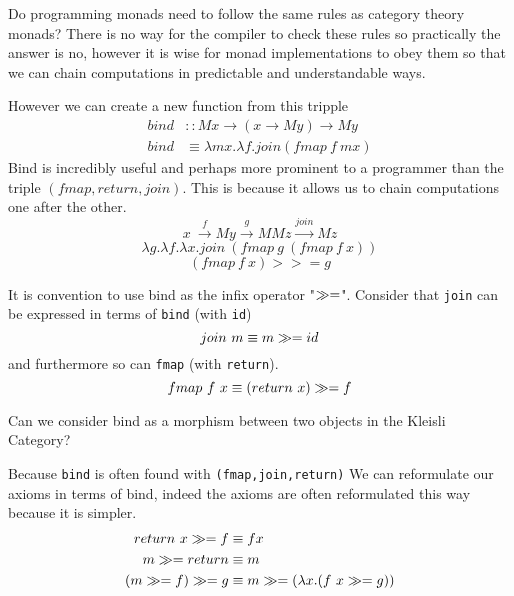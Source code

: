 Do programming monads need to follow the same rules as category theory monads?
There is no way for the compiler to check these rules so practically the answer is no,
however it is wise for monad implementations to obey them so that
we can chain computations in predictable and understandable ways.

However we can create a new function from this tripple
\begin{align}
    bind &:: M x \rightarrow (x \rightarrow M y) \rightarrow M y \\
    bind &\equiv \lambda mx. \lambda f. join(fmap\ f\ mx)
\end{align}
Bind is incredibly useful and perhaps more prominent
to a programmer than the triple $(fmap,return,join)$.
This is because it allows us to chain computations
one after the other.
\begin{equation}
    x\
    \stackrel{f}{\rightarrow} My
    \stackrel{g}{\rightarrow} MMz
    \stackrel{join}{\rightarrow} Mz
\end{equation}
\begin{equation}
    \lambda g.
    \lambda f.
    \lambda x.
    join\ (fmap\ g\ (fmap\ f\ x))
\end{equation}
\begin{equation}
    (fmap\ f\ x) >>= g
\end{equation}

It is convention to use bind as the infix operator "$\gg=$".
Consider that \texttt{join} can be expressed in terms of \texttt{bind} (with \texttt{id})
\begin{equation}
    join\ m \equiv m \gg= id
\end{equation}
and furthermore so can \texttt{fmap} (with \texttt{return}).
\begin{equation}
    fmap\ f\ x \equiv (return\ x) \gg= f
\end{equation}

Can we consider bind as a morphism between two objects in the Kleisli Category?

Because \texttt{bind} is often found with \texttt{(fmap,join,return)}
We can reformulate our axioms in terms of bind,
indeed the axioms are often reformulated this way because it is simpler.
\begin{align}
    return\ x \gg= f &\equiv f x \\
    m \gg= return &\equiv m \\
    (m \gg= f) \gg= g &\equiv m \gg= (\lambda x.(f\ x \gg= g))
\end{align}

